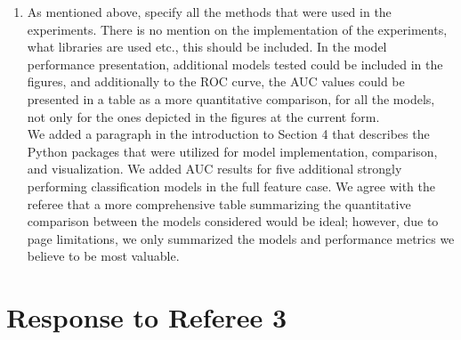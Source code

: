 \documentclass{amsart}[12pt]
\begin{document}
\begin{enumerate}
        \hspace{10pt}
    \item   {\color{blue} 
        As mentioned above, specify all the methods that were used in the experiments. There is no mention on the implementation of the experiments, what libraries are used etc., this should be included. In the model performance presentation, additional models tested could be included in the figures, and additionally to the ROC curve, the AUC values could be presented in a table as a more quantitative comparison, for all the models, not only for the ones depicted in the figures at the current form.
        }\\

        We added a paragraph in the introduction to Section 4 that describes the Python packages that were 
        utilized for model implementation, comparison, and visualization.  We added AUC results for 
        five additional strongly performing classification models in the full feature case.  We agree 
        with the referee that a more comprehensive table summarizing the quantitative comparison between 
        the models considered would be ideal; however, due to page limitations, we only summarized the 
        models and performance metrics we believe to be most valuable. 
        
\end{enumerate}

\section{Response to Referee 3}
\end{document}

